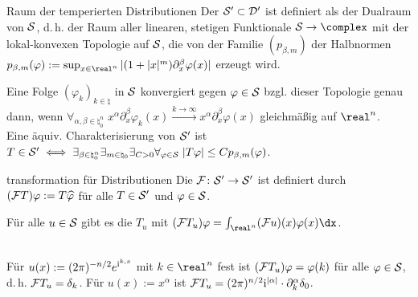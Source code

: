 \begin{Def}{Raum der temperierten Distributionen}
    Der  $\S' \subset \D'$ ist
    definiert als der Dualraum von $\S$,
    d.\,h. der Raum aller linearen, stetigen Funktionale $\S \rightarrow \complex$ mit
    der lokal-konvexen Topologie auf $\S$, die von der Familie $(p_{\beta,m})$ der Halbnormen
    $p_{\beta,m}(\varphi) := \sup_{x \in \real^n} |(1 + |x|^m) \partial_x^\beta \varphi(x)|$
    erzeugt wird.
\end{Def}

\begin{Bem}
    Eine Folge $(\varphi_k)_{k \in \natural}$ in $\S$ konvergiert gegen $\varphi \in \S$
    bzgl. dieser Topologie genau dann, wenn
    $\forall_{\alpha, \beta \in \natural_0^n}\; x^\alpha \partial_x^\beta \varphi_k(x)
    \xrightarrow{k \to \infty} x^\alpha \partial_x^\beta \varphi(x)$
    gleichmäßig auf $\real^n$.\\
    Eine äquiv. Charakterisierung von $\S'$ ist
    $T \in \S' \iff \exists_{\beta \in \natural_0^n} \exists_{m \in \natural_0}
    \exists_{C > 0} \forall_{\varphi \in \S}\; |T\varphi| \le C p_{\beta,m}(\varphi)$.
\end{Bem}

\begin{Def}{transformation für Distributionen}
    Die  $\F\colon \S' \rightarrow \S'$ ist definiert durch
    $(\F T)\varphi := T \widehat{\varphi}$ für alle $T \in \S'$ und $\varphi \in \S$.
\end{Def}

\begin{Bem}
    Für alle $u \in \S$ gibt es die  $T_u$
    mit $(\F T_u) \varphi = \int_{\real^n} (\F u)(x) \varphi(x)\dx$.
\end{Bem}

\begin{Bsp}\\
    Für $u(x) := (2\pi)^{-n/2} e^{\iu\sp{k,x}}$ mit $k \in \real^n$ fest ist
    $(\F T_u)\varphi = \varphi(k)$ für alle $\varphi \in \S$, d.\,h. $\F T_u = \delta_k$.
    Für $u(x) := x^\alpha$ ist
    $\F T_u = (2\pi)^{n/2} \iu^{|\alpha|} \cdot \partial_k^\alpha \delta_0$.
\end{Bsp}

\pagebreak
